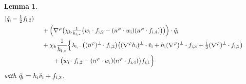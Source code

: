 \documentclass[JEP,XML,SOM,Unicode,NoFloatCountersInSection,published]{cedram}
\newtheorem{lemma}[theorem]{Lemma}
\theoremstyle{definition}
\begin{document}
\begin{lemma}
\begin{align*}
(\check{q}_\mathrm{i}-\tfrac12f_{{\rm i},2}) \\
&\quad\;
+ \Bigl(\nabla^\varphi\bigl(\chi_\mathrm{b}\tfrac{1}{h_{{\rm i},*}}
\bigl(w_\mathrm{i}\cdot f_{{\rm i},2}-(n^\varphi\cdot w_\mathrm{i})(n^\varphi\cdot f_{{\rm i},4}) \bigr) \bigr) \Bigr)\cdot\check{q}_\mathrm{i} \\
&\quad\;
+ \chi_\mathrm{b}\frac{1}{h_{{\rm i},*}}\Bigl\{
\lambda_{{\rm i},-}\bigl((n^\varphi)^\perp\cdot f_{{\rm i},2}\bigr)\bigl((\nabla^\varphi h_\mathrm{i})^\perp\cdot\check{v}_\mathrm{i}
+ h_\mathrm{i}(\nabla^\varphi)^\perp\cdot f_{{\rm i},3} + \tfrac12(\nabla^\varphi)^\perp\cdot f_{{\rm i},2} \bigr) \\
&\makebox[3em]{}
+ \bigl(w_\mathrm{i}\cdot f_{{\rm i},2}-(n^\varphi\cdot w_\mathrm{i})(n^\varphi\cdot f_{{\rm i},4}) \bigr)f_{{\rm i},1} \Bigr\}
\end{align*}
with $\check{q}_\mathrm{i}=h_\mathrm{i}\check{v}_\mathrm{i}+f_{{\rm i},2}$.
\end{lemma}
\end{document}

